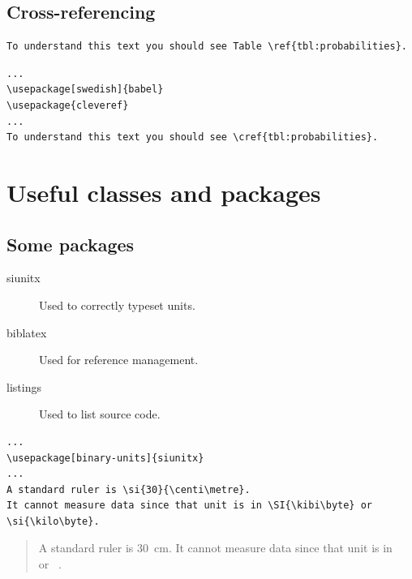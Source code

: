 \subsection{Cross-referencing}

\begin{frame}[fragile]
  \begin{example}
    \begin{lstlisting}
To understand this text you should see Table \ref{tbl:probabilities}.
    \end{lstlisting}
    \begin{lstlisting}
...
\usepackage[swedish]{babel}
\usepackage{cleveref}
...
To understand this text you should see \cref{tbl:probabilities}.
    \end{lstlisting}
  \end{example}
\end{frame}


\section{Useful classes and packages}

\subsection{Some packages}

\begin{frame}
	\begin{description}
    \item[siunitx] Used to correctly typeset units.

    \item[biblatex] Used for reference management.

    \item[listings] Used to list source code.
  \end{description}
\end{frame}

\begin{frame}[fragile]
  \begin{example}
    \begin{lstlisting}
...
\usepackage[binary-units]{siunitx}
...
A standard ruler is \si{30}{\centi\metre}.
It cannot measure data since that unit is in \SI{\kibi\byte} or 
\si{\kilo\byte}.
    \end{lstlisting}
  \end{example}

  \pause

  \begin{example}
    \begin{quote}
      A standard ruler is \SI{30}{\centi\metre}.
      It cannot measure data since that unit is in \si{\kibi\byte} or 
      \si{\kilo\byte}.
    \end{quote}
  \end{example}
\end{frame}


